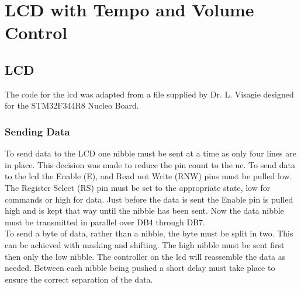 \documentclass[12pt,a4paper]{report}
\begin{document}
\section{LCD with Tempo and Volume Control}
\subsection{LCD}
The code for the \ac{lcd} was adapted from a file supplied by Dr. L. Visagie designed for the STM32F344R8 Nucleo Board. 
\subsubsection{Sending Data}
To send data to the LCD one nibble must be sent at a time as only four lines are in place. This decision was made to reduce the pin count to the \ac{uc}. To send data to the \ac{lcd} the Enable (E), and Read not Write (RNW) pins must be pulled low. The Register Select (RS) pin must be set to the appropriate state, low for commands or high for data. Just before the data is sent the Enable pin is pulled high and is kept that way until the nibble has been sent. Now the data nibble must be transmitted in parallel over DB4 through DB7. \\
To send a byte of data, rather than a nibble, the byte must be split in two. This can be achieved with masking and shifting. The high nibble must be sent first then only the low nibble. The controller on the \ac{lcd} will reassemble the data as needed. Between each nibble being pushed a short delay must take place to ensure the correct separation of the data.
\end{document}
